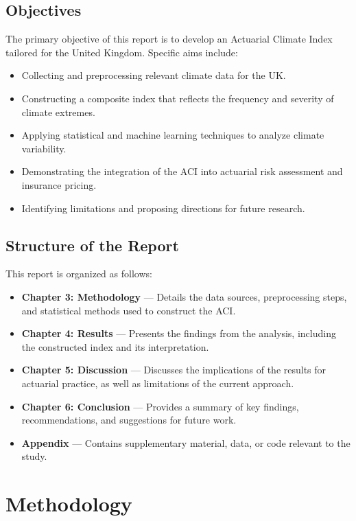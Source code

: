 \documentclass[12pt,a4paper]{report}
\begin{document}
\section{Objectives}
The primary objective of this report is to develop an Actuarial Climate Index tailored for the United Kingdom. Specific aims include:
\begin{itemize}
    \item Collecting and preprocessing relevant climate data for the UK.
    \item Constructing a composite index that reflects the frequency and severity of climate extremes.
    \item Applying statistical and machine learning techniques to analyze climate variability.
    \item Demonstrating the integration of the ACI into actuarial risk assessment and insurance pricing.
    \item Identifying limitations and proposing directions for future research.
\end{itemize}

\section{Structure of the Report}
This report is organized as follows:
\begin{itemize}
    \item \textbf{Chapter 3: Methodology} --- Details the data sources, preprocessing steps, and statistical methods used to construct the ACI.
    \item \textbf{Chapter 4: Results} --- Presents the findings from the analysis, including the constructed index and its interpretation.
    \item \textbf{Chapter 5: Discussion} --- Discusses the implications of the results for actuarial practice, as well as limitations of the current approach.
    \item \textbf{Chapter 6: Conclusion} --- Provides a summary of key findings, recommendations, and suggestions for future work.
    \item \textbf{Appendix} --- Contains supplementary material, data, or code relevant to the study.
\end{itemize}


\chapter{Methodology}
\end{document}
